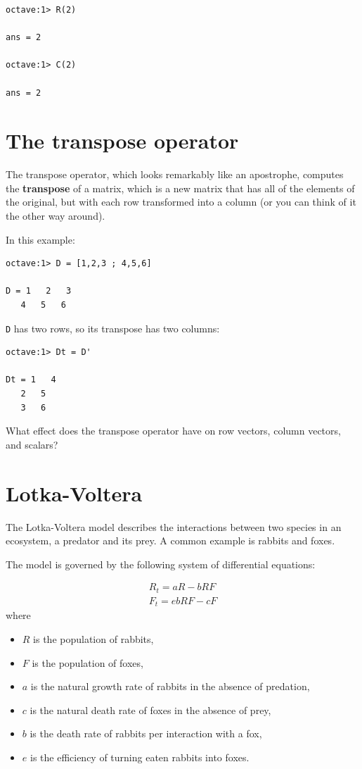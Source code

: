 \begin{verbatim}
octave:1> R(2)

ans = 2

octave:1> C(2)

ans = 2
\end{verbatim}



\section{The transpose operator}

The transpose operator, which looks remarkably like an apostrophe,
computes the {\bf transpose} of a matrix, which is a new matrix
that has all of the elements of the original, but with each row
transformed into a column (or you can think of it the other way around).

In this example:

\begin{verbatim}
octave:1> D = [1,2,3 ; 4,5,6]

D = 1   2   3
   4   5   6
\end{verbatim}

{\tt D} has two rows, so its transpose has two columns:

\begin{verbatim}
octave:1> Dt = D'

Dt = 1   4
   2   5
   3   6
\end{verbatim}

\begin{ex}
What effect does the transpose operator
have on row vectors, column vectors, and scalars?
\end{ex}


\section{Lotka-Voltera}
\label{lotka}

The Lotka-Voltera model describes the interactions between two
species in an ecosystem, a predator and its prey. A common example
is rabbits and foxes.

The model is governed by the following system of differential
equations:

\begin{eqnarray*}
R_t = a R - b R F \\
F_t = e b R F - c F
\end{eqnarray*}
%
where
%
\begin{itemize}
%
\item $R$ is the population of rabbits,
\item $F$ is the population of foxes,
\item $a$ is the natural growth rate of rabbits in the absence of predation,
\item $c$ is the natural death rate of foxes in the absence of prey,
\item $b$ is the death rate of rabbits per interaction with a fox,
\item $e$ is the efficiency of turning eaten rabbits into foxes.
%
\end{itemize}

